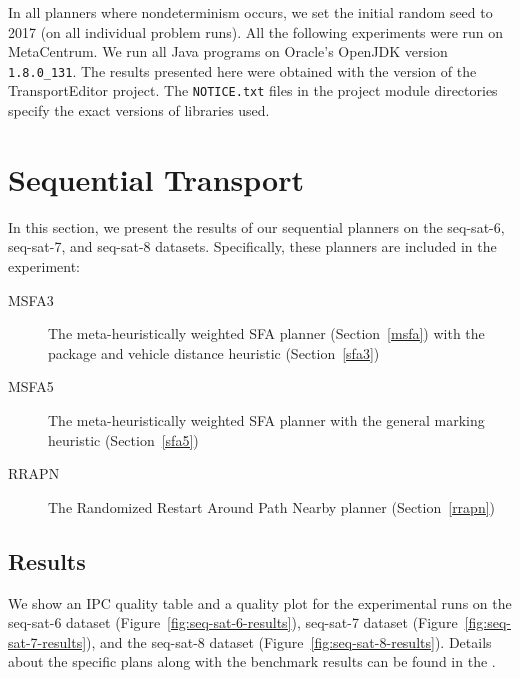 In all planners where nondeterminism occurs,
we set the initial random seed to 2017
(on all individual problem runs).
All the following experiments
were run on
MetaCentrum.
We run all Java programs on Oracle's OpenJDK 
version \texttt{1.8.0\_131}.
The results presented here were obtained with the \TEver{} version of the TransportEditor project. The \texttt{NOTICE.txt} files
in the project module directories specify
the exact versions of libraries used.



















\section{Sequential Transport}

In this section, we present the results of our sequential planners on the seq-sat-6, seq-sat-7, and seq-sat-8 datasets. Specifically, these planners are included in the experiment:
\begin{description}
\item[MSFA3] The meta-heuristically weighted SFA planner (Section~\ref{msfa}) with the package and vehicle distance heuristic (Section~\ref{sfa3})
\item[MSFA5] The meta-heuristically weighted SFA planner with the general marking heuristic (Section~\ref{sfa5})
\item[RRAPN] The Randomized Restart Around Path Nearby planner (Section~\ref{rrapn})
\end{description}

\subsection{Results}\label{sequential-results}

We show an IPC quality table and a quality plot
for the experimental runs on the seq-sat-6 dataset (Figure~\ref{fig:seq-sat-6-results}), seq-sat-7 dataset (Figure~\ref{fig:seq-sat-7-results}), and the seq-sat-8 dataset (Figure~\ref{fig:seq-sat-8-results}). Details about the specific plans along with the benchmark results can be found in the .

